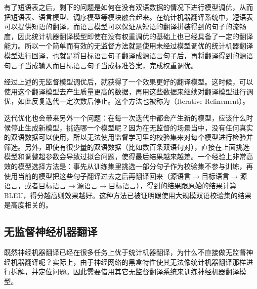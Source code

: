 \parinterval 有了短语表之后，剩下的问题是如何在没有双语数据的情况下进行模型调优，从而把短语表、语言模型、调序模型等模块融合起来。在统计机器翻译系统中，短语表可以提供短语的翻译，而语言模型可以保证从短语的翻译拼装得到的句子的流畅度，因此统计机器翻译模型即使在没有权重调优的基础上也已经具备了一定的翻译能力。所以一个简单而有效的无监督方法就是使用未经过模型调优的统计机器翻译模型进行回译，也就是将目标语言句子翻译成源语言句子后，再将翻译得到的源语句言子当成输入而目标语言句子当成标准答案，完成权重调优。

\parinterval 经过上述的无监督模型调优后，就获得了一个效果更好的翻译模型。这时候，可以使用这个翻译模型去产生质量更高的数据，再用这些数据来继续对翻译模型进行调优，如此反复迭代一定次数后停止。这个方法也被称为{\small{}}（Iterative Refinement）。

\parinterval 迭代优化也会带来另外一个问题：在每一次迭代中都会产生新的模型，应该什么时候停止生成新模型，挑选哪一个模型呢？因为在无监督的场景当中，没有任何真实的双语数据可以使用，所以无法使用监督学习里的校验集来对每个模型进行检验并筛选。另外，即使有很少量的双语数据（比如数百条双语句对），直接在上面挑选模型和调整超参数会导致过拟合问题，使得最后结果越来越差。一个经验上非常高效的模型选择方法是：事先从训练集里挑选一部分句子作为校验集不参与训练，再使用当前的模型把这些句子翻译过去之后再翻译回来（源语言$\to $目标语言$\to$源语言，或者目标语言$\to$源语言$\to$目标语言），得到的结果跟原始的结果计算BLEU，得分越高则效果越好。这种方法已被证明跟使用大规模双语校验集的结果是高度相关的。


\subsection{无监督神经机器翻译}\label{unsupervised-NMT}

\parinterval 既然神经机器翻译已经在很多任务上优于统计机器翻译，为什么不直接做无监督神经机器翻译呢？实际上，由于神经网络的黑盒特性使其无法像统计机器翻译那样进行拆解，并定位问题。因此需要借用其它无监督翻译系统来训练神经机器翻译模型。

